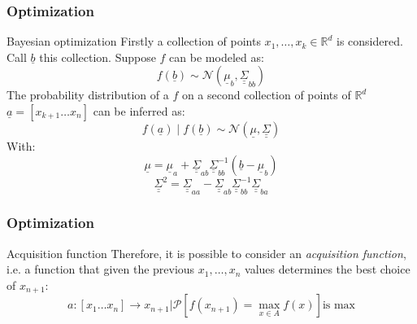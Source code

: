 \begin{frame}
    \frametitle{Optimization}
    \vskip -0.5cm
    \begin{block}{Bayesian optimization}
        Firstly a collection of points $x_1, \ldots, x_k \in \mathbb{R}^d$ is considered. Call $\underline{b}$ this collection. Suppose $f$ can be modeled as:
        \begin{equation*}
            f\left(\underline{b}\right) \sim \mathcal{N}\left(\underline{\mu}_b, \underline{\underline{\Sigma}}_{bb}\right)
        \end{equation*}
        The probability distribution of a $f$ on a second collection of points of $\mathbb{R}^d$ $\underline{a} = \left[x_{k + 1} \ldots x_{n}\right]$ can be inferred as:
        \begin{equation*}
            f\left(\underline{a}\right) \mid f\left(\underline{b}\right) \sim \mathcal{N}\left(\underline{\mu}, \underline{\underline{\Sigma}}\right)
        \end{equation*}
        With:
        \begin{equation*}
            \underline{\mu} = \underline{\mu}_{a} + \underline{\underline{\Sigma}}_{ab}\underline{\underline{\Sigma}}_{bb}^{-1}\left(\underline{b} - \underline{\mu}_b\right)
        \end{equation*}
        \begin{equation*}
            \underline{\underline{\Sigma}}^2 = \underline{\underline{\Sigma}}_{aa} - \underline{\underline{\Sigma}}_{ab}\underline{\underline{\Sigma}}_{bb}^{-1}\underline{\underline{\Sigma}}_{ba}
        \end{equation*}
    \end{block}
\end{frame}

\begin{frame}
    \frametitle{Optimization}
    \begin{exampleblock}{Acquisition function}
        Therefore, it is possible to consider an \emph{acquisition function}, i.e. a function that given the previous $x_1, \ldots, x_n$ values determines the best choice of $x_{n+1}$:
        \begin{equation*}
            a \colon \left[x_1 \ldots x_n\right] \rightarrow x_{n+1} \vert \mathcal{P}\left[f(x_{n+1}) = \max\limits_{x \in A} f\left(x\right)\right] \text{is max}
        \end{equation*}
    \end{exampleblock}
\end{frame}
